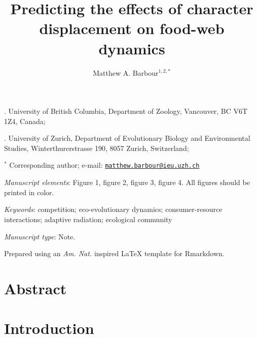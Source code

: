 \documentclass[11pt,]{article}
\title{Predicting the effects of character displacement on food-web dynamics}
\author{Matthew A. Barbour\(^{1,2,\ast}\)}
\date{}
\begin{document}
\maketitle


. University of British Columbia, Department of Zoology,
Vancouver, BC V6T 1Z4, Canada;

. University of Zurich, Department of Evolutionary Biology
and Environmental Studies, Winterthurerstrasse 190, 8057 Zurich,
Switzerland;

\(^\ast\) Corresponding author; e-mail:
\href{mailto:matthew.barbour@ieu.uzh.ch}{\nolinkurl{matthew.barbour@ieu.uzh.ch}}

\bigskip

\emph{Manuscript elements}: Figure 1, figure 2, figure 3, figure 4. All
figures should be printed in color.

\bigskip

\emph{Keywords}: competition; eco-evolutionary dynamics;
consumer-resource interactions; adaptive radiation; ecological community

\bigskip

\emph{Manuscript type}: Note.

\bigskip

\footnotesize Prepared using an \emph{Am. Nat.} inspired \LaTeX{}
template for Rmarkdown. \normalsize

\linenumbers{} \modulolinenumbers[3]

\newpage

\section{Abstract}\label{abstract}

\newpage

\section{Introduction}\label{introduction}
\end{document}
